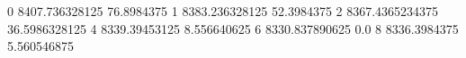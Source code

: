0 8407.736328125 76.8984375
1 8383.236328125 52.3984375
2 8367.4365234375 36.5986328125
4 8339.39453125 8.556640625
6 8330.837890625 0.0
8 8336.3984375 5.560546875
